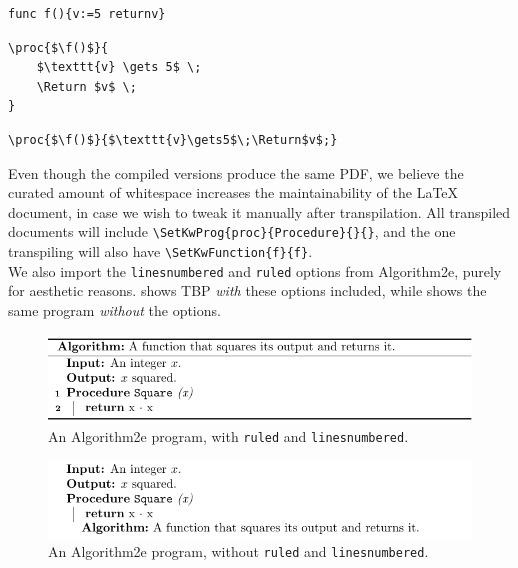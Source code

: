 \begin{lstlisting}[caption={A Gourmet function that declares a variable and returns it.}, captionpos=b, label={Gourmet f}]
func f(){v:=5 returnv}
\end{lstlisting}

\begin{lstlisting}[caption={How Psnodig transpiles the program from \Cref{Gourmet f}.}, captionpos=b, label={How Psnodig transpiles the program from}]
\proc{$\f()$}{
    $\texttt{v} \gets 5$ \;
    \Return $v$ \;
}
\end{lstlisting}

\begin{lstlisting}[caption={Alternative version of f in LaTeX with Algorithm2e.}, captionpos=b, label={Alternative version of f in LaTeX with Algorithm2e.}]
\proc{$\f()$}{$\texttt{v}\gets5$\;\Return$v$;}
\end{lstlisting}

Even though the compiled versions produce the same PDF, we believe the curated amount of whitespace increases the maintainability of the LaTeX document, in case we wish to tweak it manually after transpilation. All transpiled documents will include \texttt{\textbackslash SetKwProg\{proc\}\{Procedure\}\{\}\{\}}, and the one transpiling  will also have \texttt{\textbackslash SetKwFunction\{f\}\{f\}}. \\

We also import the \texttt{linesnumbered} and \texttt{ruled} options from Algorithm2e, purely for aesthetic reasons.  shows TBP \textit{with} these options included, while  shows the same program \textit{without} the options. \\

\begin{figure}[ht]
    \centering
    \includegraphics[scale=.95]{assets/chapter4/SquareWithOptions.pdf}
    \caption{An Algorithm2e program, with \texttt{ruled} and \texttt{linesnumbered}.}
    \label{squareWith}
\end{figure}

\begin{figure}[ht]
    \centering
    \includegraphics[scale=.95]{assets/chapter4/SquareWithoutOptions.pdf}
    \caption{An Algorithm2e program, without \texttt{ruled} and \texttt{linesnumbered}.}
    \label{squareWithout}
\end{figure}

